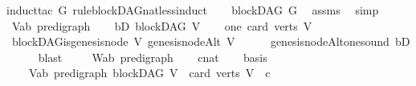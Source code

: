 \begin{isabellebody}
%
\isadelimproof
%
\endisadelimproof
%
\isatagproof
{}\isamarkupfalse%
{\isacharparenleft}{\kern0pt}induct{\isacharunderscore}{\kern0pt}tac\ G\ rule{\isacharcolon}{\kern0pt}blockDAG{\isacharunderscore}{\kern0pt}nat{\isacharunderscore}{\kern0pt}less{\isacharunderscore}{\kern0pt}induct{\isacharparenright}{\kern0pt}\isanewline
\ \ \isamarkupfalse%
\ {\isachardoublequoteopen}blockDAG\ G{\isachardoublequoteclose}\ \isamarkupfalse%
\ assms\ \isamarkupfalse%
\ simp\isanewline
{}\isamarkupfalse%
\ \isanewline
\ \ \isamarkupfalse%
\ V{\isacharcolon}{\kern0pt}{\isacharcolon}{\kern0pt}{\isachardoublequoteopen}{\isacharparenleft}{\kern0pt}{\isacharprime}{\kern0pt}a{\isacharcomma}{\kern0pt}{\isacharprime}{\kern0pt}b{\isacharparenright}{\kern0pt}\ pre{\isacharunderscore}{\kern0pt}digraph{\isachardoublequoteclose}\isanewline
\ \ \isamarkupfalse%
\ bD{\isacharcolon}{\kern0pt}\ {\isachardoublequoteopen}blockDAG\ V{\isachardoublequoteclose}\isanewline
\ \ \isamarkupfalse%
\ one{\isacharcolon}{\kern0pt}\ {\isachardoublequoteopen}card\ {\isacharparenleft}{\kern0pt}verts\ V{\isacharparenright}{\kern0pt}\ {\isacharequal}{\kern0pt}\ {}{\isachardoublequoteclose}\isanewline
\ \ \isamarkupfalse%
\ \isamarkupfalse%
\ {\isachardoublequoteopen}blockDAG{\isachardot}{\kern0pt}is{\isacharunderscore}{\kern0pt}genesis{\isacharunderscore}{\kern0pt}node\ V\ {\isacharparenleft}{\kern0pt}genesis{\isacharunderscore}{\kern0pt}nodeAlt\ V{\isacharparenright}{\kern0pt}{\isachardoublequoteclose}\isanewline
\ \ \ \ \isamarkupfalse%
\ genesis{\isacharunderscore}{\kern0pt}nodeAlt{\isacharunderscore}{\kern0pt}one{\isacharunderscore}{\kern0pt}sound\ bD\isanewline
\ \ \ \ \isamarkupfalse%
\ blast\ \isanewline
{}\isamarkupfalse%
\isanewline
\ \ \isamarkupfalse%
\ W{\isacharcolon}{\kern0pt}{\isacharcolon}{\kern0pt}{\isachardoublequoteopen}{\isacharparenleft}{\kern0pt}{\isacharprime}{\kern0pt}a{\isacharcomma}{\kern0pt}{\isacharprime}{\kern0pt}b{\isacharparenright}{\kern0pt}\ pre{\isacharunderscore}{\kern0pt}digraph{\isachardoublequoteclose}\isanewline
\ \ \isamarkupfalse%
\ c{\isacharcolon}{\kern0pt}{\isacharcolon}{\kern0pt}nat\isanewline
\ \ \isamarkupfalse%
\ basis{\isacharcolon}{\kern0pt}\ \isanewline
\ \ \ \ {\isachardoublequoteopen}{\isacharparenleft}{\kern0pt}{\isasymAnd}V{\isacharcolon}{\kern0pt}{\isacharcolon}{\kern0pt}{\isacharparenleft}{\kern0pt}{\isacharprime}{\kern0pt}a{\isacharcomma}{\kern0pt}{\isacharprime}{\kern0pt}b{\isacharparenright}{\kern0pt}\ pre{\isacharunderscore}{\kern0pt}digraph{\isachardot}{\kern0pt}\ blockDAG\ V\ {\isasymLongrightarrow}\ card\ {\isacharparenleft}{\kern0pt}verts\ V{\isacharparenright}{\kern0pt}\ {\isacharless}{\kern0pt}\ c\ {\isasymLongrightarrow}\ \isanewline

\end{isabellebody}
